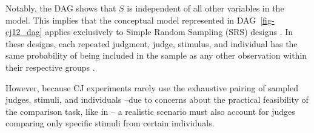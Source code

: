 \documentclass[
  authoryear,
  review,
  1p]{elsarticle}
\begin{document}
Notably, the DAG shows that \(S\) is independent of all other variables
in the model. This implies that the conceptual model represented in
DAG~\ref{fig-cj12_dag} applies exclusively to Simple Random Sampling
(SRS) designs \citep[pp.~150]{Kohler_et_al_2019}. In these designs, each
repeated judgment, judge, stimulus, and individual has the same
probability of being included in the sample as any other observation
within their respective groups \citep[pp.~16-112]{Lawson_2015}.

However, because CJ experiments rarely use the exhaustive pairing of
sampled judges, stimuli, and individuals --due to concerns about the
practical feasibility of the comparison task, like in
\citet[p.~5]{Boonen_et_al_2020}-- a realistic scenario must also account
for judges comparing only specific stimuli from certain individuals.
\end{document}
